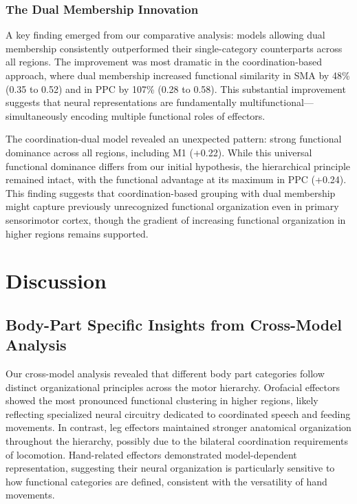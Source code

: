 \documentclass{article}
\begin{document}
\subsubsection{The Dual Membership Innovation}

A key finding emerged from our comparative analysis: models allowing dual membership consistently outperformed their single-category counterparts across all regions. The improvement was most dramatic in the coordination-based approach, where dual membership increased functional similarity in SMA by 48\% (0.35 to 0.52) and in PPC by 107\% (0.28 to 0.58). This substantial improvement suggests that neural representations are fundamentally multifunctional—simultaneously encoding multiple functional roles of effectors.

The coordination-dual model revealed an unexpected pattern: strong functional dominance across all regions, including M1 (+0.22). While this universal functional dominance differs from our initial hypothesis, the hierarchical principle remained intact, with the functional advantage at its maximum in PPC (+0.24). This finding suggests that coordination-based grouping with dual membership might capture previously unrecognized functional organization even in primary sensorimotor cortex, though the gradient of increasing functional organization in higher regions remains supported.


\section{Discussion}
\subsection{Body-Part Specific Insights from Cross-Model Analysis}

Our cross-model analysis revealed that different body part categories follow distinct organizational principles across the motor hierarchy. Orofacial effectors showed the most pronounced functional clustering in higher regions, likely reflecting specialized neural circuitry dedicated to coordinated speech and feeding movements. In contrast, leg effectors maintained stronger anatomical organization throughout the hierarchy, possibly due to the bilateral coordination requirements of locomotion. Hand-related effectors demonstrated model-dependent representation, suggesting their neural organization is particularly sensitive to how functional categories are defined, consistent with the versatility of hand movements.
\end{document}
